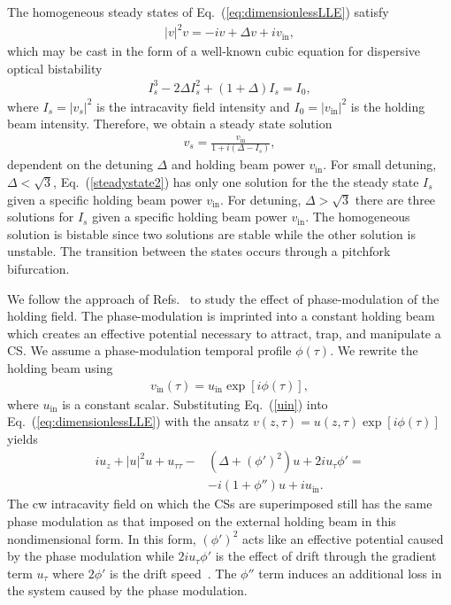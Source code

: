 \documentclass[aps,floatfix,showpacs,preprintnumbers,twocolumn,nofootinbib]{revtex4}
\begin{document}
The homogeneous steady states of Eq.~(\ref{eq:dimensionlessLLE}) satisfy 
\begin{align}
|v|^2 v = -i v + \Delta v+ i v_{\mathrm{in}}, 
\label{steadyStateNLS}
\end{align}
which may be cast in the form of a well-known cubic equation for dispersive optical bistability~\cite{Grelu,LL,info2,Gomila2007}
\begin{align}
I_s^3 - 2\Delta I_s^2 + (1+ \Delta) I_s = I_0,
\label{steadystate2}
\end{align}
where $I_s = |v_s|^2$ is the intracavity field intensity and $I_0 = |v_{\mathrm{in}}|^2$ is the holding beam intensity.  Therefore, we obtain a steady state solution
\begin{align}
v_s = \frac{v_{\mathrm{in}}}{1+ i (\Delta - I_s)},
\end{align}
dependent on the detuning $\Delta$ and holding beam power $v_{\mathrm{in}}$.  For small detuning, $\Delta < \sqrt{3}$, Eq.~(\ref{steadystate2}) has only one solution for the the steady state $I_s$ given a specific holding beam power $v_{\mathrm{in}}$.  For detuning, $\Delta > \sqrt{3}$ there are three solutions for $I_s$ given a specific holding beam power $v_{\mathrm{in}}$.  The homogeneous solution is bistable since two solutions are stable while the other solution is unstable.  The transition between the states occurs through a pitchfork bifurcation.

We follow the approach of Refs.~\cite{tweeze,firth96} to study the effect of phase-modulation of the holding field.  The phase-modulation is imprinted into a constant holding beam which creates an effective potential necessary to attract, trap, and manipulate a CS.  We assume a phase-modulation temporal profile $\phi(\tau)$.  We rewrite the holding beam using  
\begin{align}
v_{\mathrm{in}} (\tau) = u_{\mathrm{in}} \exp[i \phi(\tau)], \label{uin}
\end{align}
where $u_{\mathrm{in}}$ is a constant scalar.  Substituting Eq.~(\ref{uin}) into Eq.~(\ref{eq:dimensionlessLLE}) with the ansatz $v(z, \tau) = u(z, \tau) \exp[i \phi(\tau)]$ yields 
\begin{align}
i u_z + |u|^2 u + u_{\tau\tau} -& (\Delta + (\phi')^2) u + 2i u_{\tau} \phi' = \nonumber \\
& - i (1+\phi'') u + i u_{\mathrm{in}}.
\label{eq:LLETweeze}
\end{align}
The cw intracavity field on which the CSs are superimposed still has the same phase modulation as that imposed on the external holding beam in this nondimensional form.  In this form, $(\phi')^2$ acts like an effective potential caused by the phase modulation while $ 2i u_{\tau} \phi'$ is the effect of drift through the gradient term $u_{\tau}$ where $2 \phi'$ is the drift speed~\cite{ParraRivas2014}.  The $\phi''$ term induces an additional loss in the system caused by the phase modulation.
\end{document}
